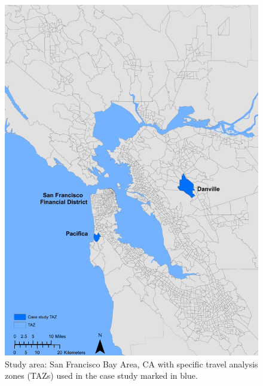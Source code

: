 \begin{figure}
\centering
\includegraphics[width=6in]{FIGS/equity_case.pdf} 
\caption{Study area: San Francisco Bay Area, CA with specific travel analysis zones (TAZs) used in the case study marked in blue.}
\label{fig:equity_study_area}
\end{figure}

